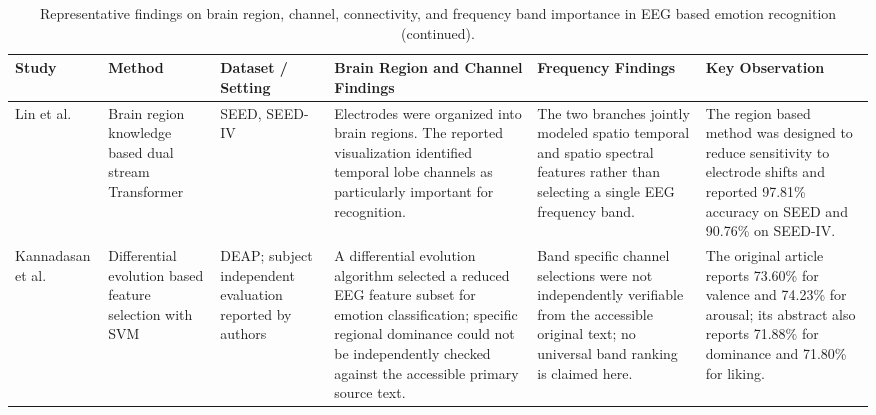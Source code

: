 \documentclass[ASNA,twocolumn]{USG}
\newcommand{\lightrowsep}{%
  \arrayrulecolor{lightrowgray}%
  \specialrule{0.30pt}{3.5pt}{3.5pt}%
  \arrayrulecolor{black}%
}
\begin{document}
\begin{small}
\begin{table}[tp]
\scriptsize
\centering
\setlength{\tabcolsep}{2pt}
\renewcommand{\arraystretch}{1.07}
\addtocounter{table}{-1}

\caption{Representative findings on brain region, channel, connectivity, and frequency band importance in EEG based emotion recognition (continued).}

\begin{tabularx}{\textwidth}{@{}
>{\raggedright\arraybackslash}p{}
>{\raggedright\arraybackslash}p{}
>{\raggedright\arraybackslash}p{}
>{\raggedright\arraybackslash}X
>{\raggedright\arraybackslash}X
>{\raggedright\arraybackslash}X
@{}}
\toprule
\textbf{Study} &
\textbf{Method} &
\textbf{Dataset / Setting} &
\textbf{Brain Region and Channel Findings} &
\textbf{Frequency Findings} &
\textbf{Key Observation} \\
\midrule

Lin et al.~\cite{lin2025brain} &
Brain region knowledge based dual stream Transformer &
SEED, SEED-IV &
Electrodes were organized into brain regions. The reported visualization identified temporal lobe channels as particularly important for recognition. &
The two branches jointly modeled spatio temporal and spatio spectral features rather than selecting a single EEG frequency band. &
The region based method was designed to reduce sensitivity to electrode shifts and reported 97.81\% accuracy on SEED and 90.76\% on SEED-IV. \\

\lightrowsep

Kannadasan et al.~\cite{kannadasan2023eeg} &
Differential evolution based feature selection with SVM &
DEAP; subject independent evaluation reported by authors &
A differential evolution algorithm selected a reduced EEG feature subset for emotion classification; specific regional dominance could not be independently checked against the accessible primary source text. &
Band specific channel selections were not independently verifiable from the accessible original text; no universal band ranking is claimed here. &
The original article reports 73.60\% for valence and 74.23\% for arousal; its abstract also reports 71.88\% for dominance and 71.80\% for liking. \\

\bottomrule
\end{tabularx}
\end{table}
\end{small}
\end{document}

